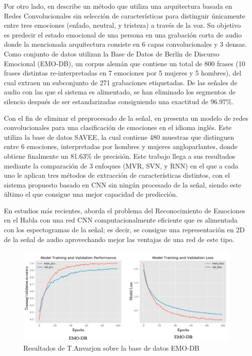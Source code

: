 \documentclass[11pt,a4paper,spanish]{book}
\begin{document}
	Por otro lado, en \cite{Harar2017} describe un método que utiliza una arquitectura basada en Redes Convolucionales sin selección de características para distinguir únicamente entre tres emociones (enfado, neutral, y tristeza) a través de la voz. Su objetivo es predecir el estado emocional de una persona en una grabación corta de audio donde la mencionada arquitectura consiste en 6 capas convolucionales y 3 densas. Como conjunto de datos utilizan la Base de Datos de Berlín de Discurso Emocional (EMO-DB), un corpus alemán que contiene un total de 800 frases (10 frases distintas re-interpretadas en 7 emociones por 5 mujeres y 5 hombres), del cual extraen un subconjunto de 271 grabaciones etiquetadas. De las señales de audio con las que el sistema es alimentado, se han eliminado los segmentos de silencio después de ser estandarizadas consiguiendo una exactitud de 96.97\%.
	
	 Con el fin de eliminar el preprocesado de la señal, en \cite{AbdulQayyum2019}  presenta un modelo de redes convolucionales para una clasificación de emociones en el idioma inglés. Este utiliza la base de datos SAVEE, la cual contiene 480 muestras que distinguen entre 6 emociones, interpretadas por hombres y mujeres angloparlantes, donde obtiene finalmente un 81.63\% de precisión. Este trabajo llega a sus resultados mediante la comparación de 3 enfoques (MVR, SVN, y RNN) en el que a cada uno le aplican tres métodos de extracción de características distintos, con el sistema propuesto basado en CNN sin ningún procesado de la señal, siendo este último el que consigue una mejor capacidad de predicción.
	
	En estudios más recientes, \cite{Anvarjon2020} aborda el problema del Reconocimiento de Emociones en el Habla con una red CNN computacionalmente eficiente que es alimentada con los espectogramas de la señal; es decir, se consigue una representación en 2D de la señal de audio aprovechando mejor las ventajas de una red de este tipo. 
	\begin{figure}[H]
		\centering
		\includegraphics[scale=0.35]{anvarjon2020_emodb.JPG} 
		\caption{Resultados de T.Anvarjon sobre la base de datos EMO-DB}
		\label{fig:anvarjon_emo_plot}
	\end{figure}
\end{document}
